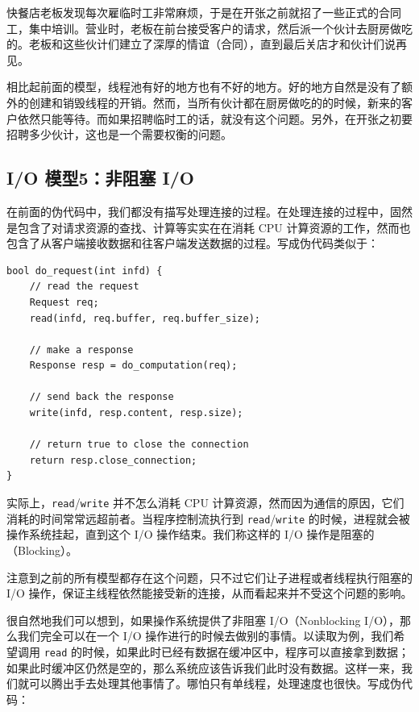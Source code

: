 \documentclass[a4paper]{article}
\begin{document}
快餐店老板发现每次雇临时工非常麻烦，于是在开张之前就招了一些正式的合同工，集中培训。营业时，老板在前台接受客户的请求，然后派一个伙计去厨房做吃的。老板和这些伙计们建立了深厚的情谊（合同），直到最后关店才和伙计们说再见。

相比起前面的模型，线程池有好的地方也有不好的地方。好的地方自然是没有了额外的创建和销毁线程的开销。然而，当所有伙计都在厨房做吃的的时候，新来的客户依然只能等待。而如果招聘临时工的话，就没有这个问题。另外，在开张之初要招聘多少伙计，这也是一个需要权衡的问题。

\subsection{I/O 模型5：非阻塞 I/O}

在前面的伪代码中，我们都没有描写处理连接的过程。在处理连接的过程中，固然是包含了对请求资源的查找、计算等实实在在消耗 CPU 计算资源的工作，然而也包含了从客户端接收数据和往客户端发送数据的过程。写成伪代码类似于：

\begin{verbatim}
bool do_request(int infd) {
    // read the request
    Request req;
    read(infd, req.buffer, req.buffer_size);
    
    // make a response
    Response resp = do_computation(req);
    
    // send back the response
    write(infd, resp.content, resp.size);
    
    // return true to close the connection
    return resp.close_connection;
}
\end{verbatim}

实际上，\texttt{read}/\texttt{write} 并不怎么消耗 CPU 计算资源，然而因为通信的原因，它们消耗的时间常常远超前者。当程序控制流执行到 \texttt{read}/\texttt{write} 的时候，进程就会被操作系统挂起，直到这个 I/O 操作结束。我们称这样的 I/O 操作是阻塞的（Blocking）。

注意到之前的所有模型都存在这个问题，只不过它们让子进程或者线程执行阻塞的 I/O 操作，保证主线程依然能接受新的连接，从而看起来并不受这个问题的影响。

很自然地我们可以想到，如果操作系统提供了非阻塞 I/O（Nonblocking I/O），那么我们完全可以在一个 I/O 操作进行的时候去做别的事情。以读取为例，我们希望调用 \texttt{read} 的时候，如果此时已经有数据在缓冲区中，程序可以直接拿到数据；如果此时缓冲区仍然是空的，那么系统应该告诉我们此时没有数据。这样一来，我们就可以腾出手去处理其他事情了。哪怕只有单线程，处理速度也很快。写成伪代码：
\end{document}
